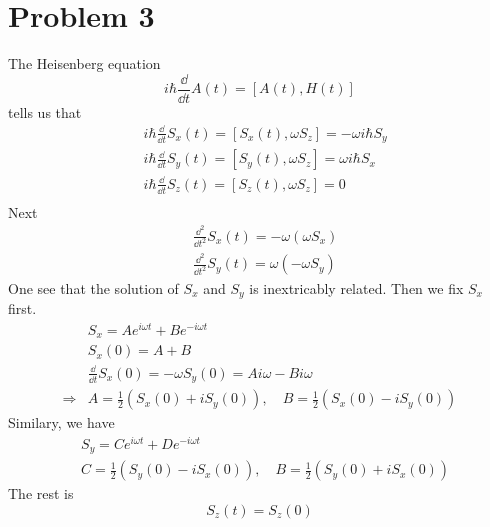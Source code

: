 \documentclass{article}
\begin{document}
\section*{Problem 3}
The Heisenberg equation
\begin{equation*}
    i\hbar \frac{\dd }{\dd t}A(t) = [A(t),H(t)]
\end{equation*}
tells us that
\begin{align*}
    &i\hbar \frac{\dd}{\dd t} S_x(t) = [S_x(t),\omega S_z]
    = -\omega i\hbar S_y \\
    &i\hbar \frac{\dd}{\dd t} S_y(t) = [S_y(t),\omega S_z]
    = \omega i\hbar S_x \\
    &i\hbar \frac{\dd}{\dd t} S_z(t) = [S_z(t),\omega S_z] = 0 \\
\end{align*}
Next
\begin{align*}
    &\frac{\dd^2}{\dd t^2}S_x(t) = -\omega (\omega S_x) \\
    &\frac{\dd^2}{\dd t^2}S_y(t) = \omega (-\omega S_y)
\end{align*}
One see that the solution of $S_x$ and $S_y$ is inextricably related.
Then we fix $S_x$ first.
\begin{align}
    &S_x = A e^{i\omega t} + Be^{-i\omega t} \\
    &S_x(0) = A+B \nonumber\\
    &\frac{\dd}{\dd t}S_x(0) = -\omega S_y(0) = Ai\omega- Bi\omega
    \nonumber\\
    \Rightarrow
    &A = \frac{1}{2}(S_x(0)+iS_y(0)),\quad B=\frac{1}{2}(S_x(0)-iS_y(0))
\end{align}
Similary, we have
\begin{align}
    &S_y = C e^{i\omega t} + De^{-i\omega t} \nonumber\\
    &C = \frac{1}{2}(S_y(0)-iS_x(0)),\quad B=\frac{1}{2}(S_y(0)+iS_x(0))
\end{align}
The rest is 
\begin{equation}
S_z(t)=S_z(0)
\end{equation}
\end{document}
